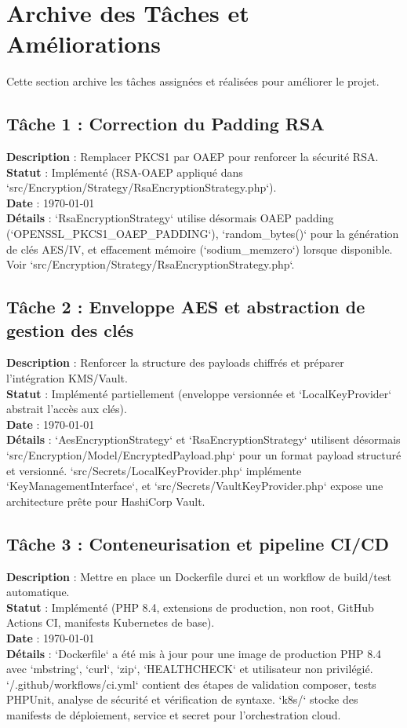 \documentclass{article}
\begin{document}
\section{Archive des Tâches et Améliorations}
Cette section archive les tâches assignées et réalisées pour améliorer le projet.

\subsection{Tâche 1 : Correction du Padding RSA}
\textbf{Description} : Remplacer PKCS1 par OAEP pour renforcer la sécurité RSA. \\
\textbf{Statut} : Implémenté (RSA-OAEP appliqué dans `src/Encryption/Strategy/RsaEncryptionStrategy.php`). \\
\textbf{Date} : \today \\
\textbf{Détails} : `RsaEncryptionStrategy` utilise désormais OAEP padding (`OPENSSL_PKCS1_OAEP_PADDING`), `random_bytes()` pour la génération de clés AES/IV, et effacement mémoire (`sodium_memzero`) lorsque disponible. Voir `src/Encryption/Strategy/RsaEncryptionStrategy.php`.

\subsection{Tâche 2 : Enveloppe AES et abstraction de gestion des clés}
\textbf{Description} : Renforcer la structure des payloads chiffrés et préparer l'intégration KMS/Vault. \\
\textbf{Statut} : Implémenté partiellement (enveloppe versionnée et `LocalKeyProvider` abstrait l'accès aux clés). \\
\textbf{Date} : \today \\
\textbf{Détails} : `AesEncryptionStrategy` et `RsaEncryptionStrategy` utilisent désormais `src/Encryption/Model/EncryptedPayload.php` pour un format payload structuré et versionné. `src/Secrets/LocalKeyProvider.php` implémente `KeyManagementInterface`, et `src/Secrets/VaultKeyProvider.php` expose une architecture prête pour HashiCorp Vault.

\subsection{Tâche 3 : Conteneurisation et pipeline CI/CD}
\textbf{Description} : Mettre en place un Dockerfile durci et un workflow de build/test automatique. \\
\textbf{Statut} : Implémenté (PHP 8.4, extensions de production, non root, GitHub Actions CI, manifests Kubernetes de base). \\
\textbf{Date} : \today \\
\textbf{Détails} : `Dockerfile` a été mis à jour pour une image de production PHP 8.4 avec `mbstring`, `curl`, `zip`, `HEALTHCHECK` et utilisateur non privilégié. `/.github/workflows/ci.yml` contient des étapes de validation composer, tests PHPUnit, analyse de sécurité et vérification de syntaxe. `k8s/` stocke des manifests de déploiement, service et secret pour l'orchestration cloud.
\end{document}
